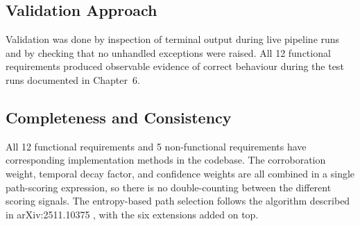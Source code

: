 \begin{table}[H]
\centering
\caption{Requirement-to-implementation traceability}
\label{tab:req_trace}
\end{table}

\subsection{Validation Approach}

Validation was done by inspection of terminal output during live pipeline runs
and by checking that no unhandled exceptions were raised. All 12 functional
requirements produced observable evidence of correct behaviour during the test
runs documented in Chapter~6.

\subsection{Completeness and Consistency}

All 12 functional requirements and 5 non-functional requirements have
corresponding implementation methods in the codebase. The corroboration weight,
temporal decay factor, and confidence weights are all combined in a single
path-scoring expression, so there is no double-counting between the different
scoring signals. The entropy-based path selection follows the algorithm
described in arXiv:2511.10375 \cite{truthfulrag2024}, with the six extensions
added on top.


